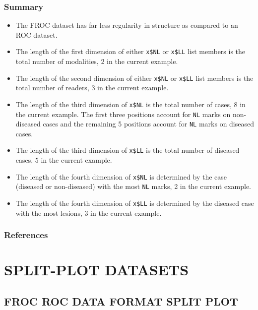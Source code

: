 \documentclass[]{book}
\providecommand{\tightlist}{%
  \setlength{\itemsep}{0pt}\setlength{\parskip}{0pt}}
\begin{document}
\hypertarget{summary-1}{%
\section{Summary}\label{summary-1}}

\begin{itemize}
\tightlist
\item
  The FROC dataset has far less regularity in structure as compared to an ROC dataset.
\item
  The length of the first dimension of either \texttt{x\$NL} or \texttt{x\$LL} list members is the total number of modalities, 2 in the current example.
\item
  The length of the second dimension of either \texttt{x\$NL} or \texttt{x\$LL} list members is the total number of readers, 3 in the current example.
\item
  The length of the third dimension of \texttt{x\$NL} is the total number of cases, 8 in the current example. The first three positions account for \texttt{NL} marks on non-diseased cases and the remaining 5 positions account for \texttt{NL} marks on diseased cases.
\item
  The length of the third dimension of \texttt{x\$LL} is the total number of diseased cases, 5 in the current example.
\item
  The length of the fourth dimension of \texttt{x\$NL} is determined by the case (diseased or non-diseased) with the most \texttt{NL} marks, 2 in the current example.
\item
  The length of the fourth dimension of \texttt{x\$LL} is determined by the diseased case with the most lesions, 3 in the current example.
\end{itemize}

\hypertarget{references-3}{%
\section{References}\label{references-3}}

\hypertarget{part-split-plot-datasets}{%
\part*{SPLIT-PLOT DATASETS}\label{part-split-plot-datasets}}

\hypertarget{frocSpdataformat}{%
\chapter{FROC ROC DATA FORMAT SPLIT PLOT}\label{frocSpdataformat}}
\end{document}

